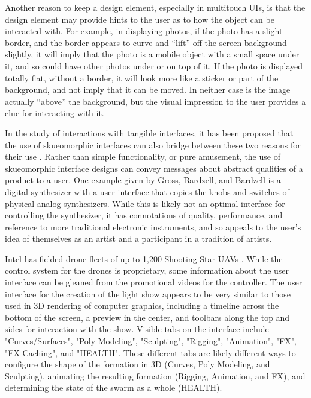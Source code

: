 Another reason to keep a design element, especially in multitouch UIs, is that the design element may provide hints to the user as to how the object can be interacted with. 
For example, in displaying photos, if the photo has a slight border, and the border appears to curve and ``lift'' off the screen background slightly, it will imply that the photo is a mobile object with a small space under it, and so could have other photos under or on top of it. 
If the photo is displayed totally flat, without a border, it will look more like a sticker or part of the background, and not imply that it can be moved. 
In neither case is the image actually ``above'' the background, but the visual impression to the user provides a clue for interacting with it. 

In the study of interactions with tangible interfaces, it has been proposed that the use of skueomorphic interfaces can also bridge between these two reasons for their use \citep{gross2014skeu}.
Rather than simple functionality, or pure amusement, the use of skueomorphic interface designs can convey messages about abstract qualities of a product to a user. 
One example given by Gross, Bardzell, and Bardzell is a digital synthesizer with a user interface that copies the knobs and switches of physical analog synthesizers. 
While this is likely not an optimal interface for controlling the synthesizer, it has connotations of quality, performance, and reference to more traditional electronic instruments, and so appeals to the user's idea of themselves as an artist and a participant in a tradition of artists. 

Intel has fielded drone fleets of up to 1,200 Shooting Star UAVs \citep{IntelDronesPage}. 
While the control system for the drones is proprietary, some information about the user interface can be gleaned from the promotional videos for the controller. 
The user interface for the creation of the light show appears to be very similar to those used in 3D rendering of computer graphics, including a timeline across the bottom of the screen, a preview in the center, and toolbars along the top and sides for interaction with the show. 
Visible tabs on the interface include "Curves/Surfaces", "Poly Modeling", "Sculpting", "Rigging", "Animation", "FX", "FX Caching", and "HEALTH". 
These different tabs are likely different ways to configure the shape of the formation in 3D (Curves, Poly Modeling, and Sculpting), animating the resulting formation (Rigging, Animation, and FX), and determining the state of the swarm as a whole (HEALTH). 

